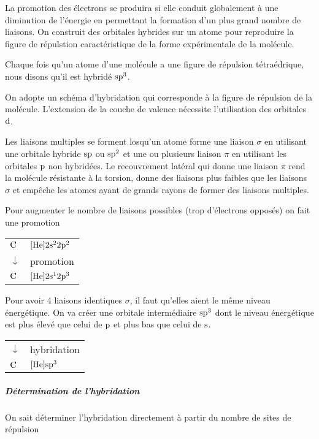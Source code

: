 
La promotion des électrons se produira si elle conduit globalement à une diminution de l'énergie en permettant la formation d'un plus grand nombre de liaisons.
On construit des orbitales hybrides sur un atome pour reproduire la figure de répulstion caractéristique de la forme expérimentale de la molécule.

Chaque fois qu'un atome d'une molécule a une figure de répulsion tétraédrique, nous disons qu'il est hybridé $\mathrm{s}\mathrm{p}^3$.

On adopte un schéma d'hybridation qui corresponde à la figure de répulsion de la molécule.
L'extension de la couche de valence nécessite l'utilisation des orbitales $\mathrm{d}$.

Les liaisons multiples se forment losqu'un atome forme une liaison $\sigma$ en utilisant une orbitale hybride $\mathrm{s}\mathrm{p}$ ou $\mathrm{s}\mathrm{p}^2$ et une ou plusieurs liaison $\pi$ en utilisant les orbitales $\mathrm{p}$ non hybridées.
Le recouvrement latéral qui donne une liaison $\pi$ rend la molécule résistante à la torsion, donne des liaisons plus faibles que les liaisons $\sigma$ et empêche les atomes ayant de grands rayons de former des liaisons multiples.


Pour augmenter le nombre de liaisons possibles (trop d'électrons opposés) on fait une promotion
\begin{center}
	\begin{tabular}{ll}
		$\ce{C}$ & $[\ce{He}]2\sorb^22\porb^2$\\
		$\downarrow$ &  promotion\\
		$\ce{C}$ & $[\ce{He}]2\sorb^12\porb^3$
	\end{tabular}
\end{center}

Pour avoir 4 liaisons identiques $\sigma$, %
il faut qu'elles aient le même niveau énergétique.
On va créer une orbitale intermédiaire $\mathrm{s}\mathrm{p}^3$ dont le niveau énergétique est plus élevé que celui de $\mathrm{p}$ et plus bas que celui de $\mathrm{s}$.

\begin{center}
	\begin{tabular}{ll}
		$\downarrow$ &  hybridation\\
		$\ce{C}$ & $[\ce{He}]\sorb\porb^3$
	\end{tabular}
\end{center}

\subparagraph{Détermination de l'hybridation}
On sait déterminer l'hybridation directement à partir du nombre de sites de répulsion

